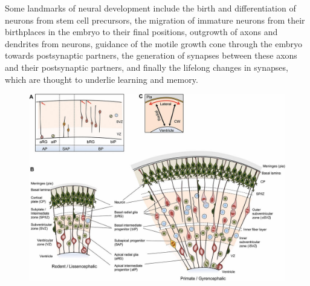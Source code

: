 Some landmarks of neural development include the birth and differentiation of neurons from stem cell precursors, the migration of immature neurons from their birthplaces in the embryo to their final positions, outgrowth of axons and dendrites from neurons, guidance of the motile growth cone through the embryo towards postsynaptic partners, the generation of synapses between these axons and their postsynaptic partners, and finally the lifelong changes in synapses, which are thought to underlie learning and memory.



\begin{figure}

{\centering \includegraphics[width=0.7\linewidth]{./figures/development/neural_precursor} 

}


\end{figure}
